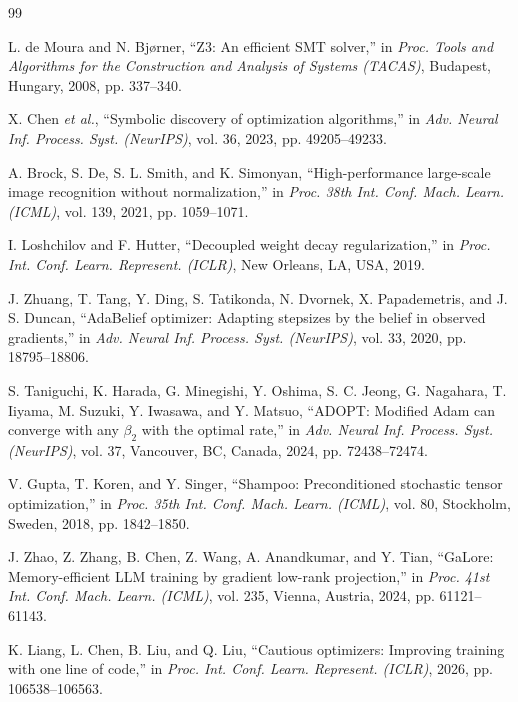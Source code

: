 \documentclass[11pt,a4paper]{article}
\renewcommand{\_}{\origunderscore\allowbreak}
\begin{document}
\clearpage
\begin{thebibliography}{99}
\small

L. de Moura and N. Bj{\o}rner, ``Z3: An efficient SMT solver,'' in \textit{Proc. Tools and Algorithms for the Construction and Analysis of Systems (TACAS)}, Budapest, Hungary, 2008, pp. 337--340.

X. Chen \textit{et al.}, ``Symbolic discovery of optimization algorithms,'' in \textit{Adv. Neural Inf. Process. Syst. (NeurIPS)}, vol. 36, 2023, pp. 49205--49233.

A. Brock, S. De, S. L. Smith, and K. Simonyan, ``High-performance large-scale image recognition without normalization,'' in \textit{Proc. 38th Int. Conf. Mach. Learn. (ICML)}, vol. 139, 2021, pp. 1059--1071.

I. Loshchilov and F. Hutter, ``Decoupled weight decay regularization,'' in \textit{Proc. Int. Conf. Learn. Represent. (ICLR)}, New Orleans, LA, USA, 2019.

J. Zhuang, T. Tang, Y. Ding, S. Tatikonda, N. Dvornek, X. Papademetris, and J. S. Duncan, ``AdaBelief optimizer: Adapting stepsizes by the belief in observed gradients,'' in \textit{Adv. Neural Inf. Process. Syst. (NeurIPS)}, vol. 33, 2020, pp. 18795--18806.

S. Taniguchi, K. Harada, G. Minegishi, Y. Oshima, S. C. Jeong, G. Nagahara, T. Iiyama, M. Suzuki, Y. Iwasawa, and Y. Matsuo, ``ADOPT: Modified Adam can converge with any $\beta_2$ with the optimal rate,'' in \textit{Adv. Neural Inf. Process. Syst. (NeurIPS)}, vol. 37, Vancouver, BC, Canada, 2024, pp. 72438--72474.

V. Gupta, T. Koren, and Y. Singer, ``Shampoo: Preconditioned stochastic tensor optimization,'' in \textit{Proc. 35th Int. Conf. Mach. Learn. (ICML)}, vol. 80, Stockholm, Sweden, 2018, pp. 1842--1850.

J. Zhao, Z. Zhang, B. Chen, Z. Wang, A. Anandkumar, and Y. Tian, ``GaLore: Memory-efficient LLM training by gradient low-rank projection,'' in \textit{Proc. 41st Int. Conf. Mach. Learn. (ICML)}, vol. 235, Vienna, Austria, 2024, pp. 61121--61143.

K. Liang, L. Chen, B. Liu, and Q. Liu, ``Cautious optimizers: Improving training with one line of code,'' in \textit{Proc. Int. Conf. Learn. Represent. (ICLR)}, 2026, pp. 106538--106563.


\end{thebibliography}
\end{document}
